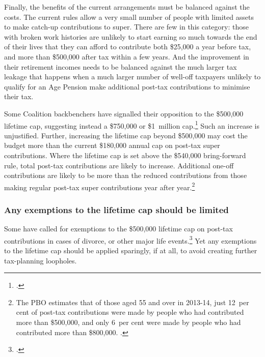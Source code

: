 \documentclass[continuous]{grattan}\usepackage[]{graphicx}\usepackage[]{color}
\begin{document}
Finally, the benefits of the current arrangements must be balanced against the costs. 
The current rules allow a very small number of people with limited assets to make catch-up contributions to super. 
There are few in this category: those with broken work histories are unlikely to start earning so much towards the end of their lives that they can afford to contribute both \$25,000 a year before tax, and more than \$500,000 after tax within a few years. 
And the improvement in their retirement incomes needs to be balanced against the much larger tax leakage that happens when a much larger number of well-off taxpayers unlikely to qualify for an Age Pension make additional post-tax contributions to minimise their tax. 


Some Coalition backbenchers have signalled their opposition to the \$500,000 lifetime cap, suggesting instead a \$750,000 or \$1~million cap.\footcite{Coorey-2016-Govt-consider-concessions-to-appease-MPs} %
Such an increase is unjustified. 
Further, increasing the lifetime cap beyond \$500,000 may cost the budget more than the current \$180,000 annual cap on post-tax super contributions. 
Where the lifetime cap is set above the \$540,000 bring-forward rule, total post-tax contributions are likely to increase. 
Additional one-off contributions are likely to be more than the reduced contributions from those making regular post-tax super contributions year after year.\footnote{%
The PBO estimates that of those aged 55 and over in 2013-14, just 12~per cent of post-tax contributions were made by people who had contributed more than \$500,000, and only 6~per cent were made by people who had contributed more than \$800,000. \textcite{PBO2015-Super-for-retirement-not-tax-minimisation}.%
%
}  

\subsubsection{Any exemptions to the lifetime cap should be limited}
Some have called for exemptions to the \$500,000 lifetime cap on post-tax contributions in cases of divorce, or other major life events.\footcite{AFR-Super-cap-carve-outs-leave-industry-underwhelmed-2016}  
Yet any exemptions to the lifetime cap should be applied sparingly, if at all, to avoid creating further tax-planning loopholes. 
\end{document}
